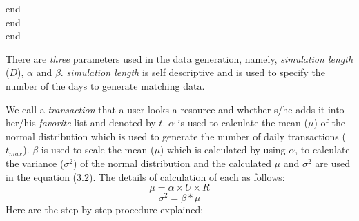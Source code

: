 \documentclass[12pt,a4paper]{report}
\begin{document}
	\hspace{3.2cm}end\\

	\hspace{2.4cm}end\\

	\hspace{1.6cm}end\\

	\clearpage
	
	\normalsize
	There are \emph{three} parameters used in the data generation, namely, \emph{simulation length} ($D$),  $\alpha$ and $\beta$. \emph{simulation length} is self descriptive and is used to specify the number of the days to generate matching data.  \par
	We call a \emph{transaction} that a user looks a resource and whether s/he adds it into her/his \emph{favorite} list and denoted by $t$. $\alpha$ is used to calculate the mean ($\mu$) of the normal distribution which is used to generate the number of daily transactions ($t_{max}$). $\beta$ is used to scale the mean ($\mu$) which is calculated by using $\alpha$, to calculate the variance ($\sigma^2$) of the normal distribution and the calculated $\mu$ and $\sigma^2$ are used in the equation ($3.2$). The details of calculation of each as follows: \\

	\begin{equation}
	\mu = \alpha \times U \times R
	\end{equation}
	\begin{equation}
	\sigma^2 =  \beta * \mu 
	\end{equation}
	Here are the step by step procedure explained: 
\end{document}
